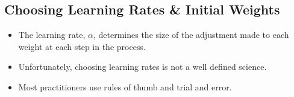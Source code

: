 \documentclass[xcolor={table}]{beamer}
\begin{document}
\subsection{Choosing Learning Rates \& Initial Weights}

\begin{frame}
\begin{itemize}
\item The learning rate, \alert{$\alpha$}, determines the size of the adjustment made to each weight at each step in the process. 
\item Unfortunately, choosing learning rates is not a well defined science. 
\item Most practitioners use rules of thumb and trial and error. 
\end{itemize}
\end{frame}
\end{document}
